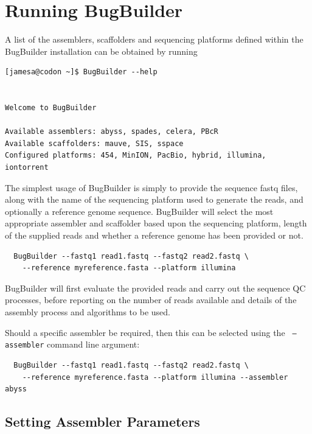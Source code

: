 \documentclass[a4paper,10pt]{article}
\begin{document}
\section{Running BugBuilder}

A list of the assemblers, scaffolders and sequencing platforms defined within
the BugBuilder installation can be obtained by running

\begin{verbatim}
[jamesa@codon ~]$ BugBuilder --help
 

Welcome to BugBuilder

Available assemblers: abyss, spades, celera, PBcR
Available scaffolders: mauve, SIS, sspace
Configured platforms: 454, MinION, PacBio, hybrid, illumina, iontorrent

\end{verbatim}

The simplest usage of BugBuilder is simply to provide the sequence fastq files,
along with the name of the sequencing platform used to generate the reads, and
optionally a reference genome sequence. BugBuilder will select the most
appropriate assembler and scaffolder based upon the sequencing platform, length
of the supplied reads and whether a reference genome has been provided or not.

\begin{verbatim}
  BugBuilder --fastq1 read1.fastq --fastq2 read2.fastq \
    --reference myreference.fasta --platform illumina
\end{verbatim}

BugBuilder will first evaluate the provided reads and carry out the sequence QC
processes, before reporting on the number of reads available and details of the
assembly process and algorithms to be  used. 

Should a specific assembler be required, then this can be selected using the {\tt
--assembler} command line argument: 

\begin{verbatim}
  BugBuilder --fastq1 read1.fastq --fastq2 read2.fastq \ 
    --reference myreference.fasta --platform illumina --assembler abyss 
\end{verbatim}

\subsection{Setting Assembler Parameters}
\end{document}
